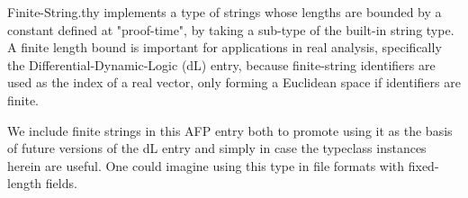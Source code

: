 %
\begin{isabellebody}%
%
%
\begin{isamarkuptext}%
Finite-String.thy implements a type of strings whose lengths are bounded by a constant defined 
    at "proof-time", by taking a sub-type of the built-in string type. A finite length bound is
    important for applications in real analysis, specifically the Differential-Dynamic-Logic (dL) 
    entry, because finite-string identifiers are used as the index of a real vector, only forming a
    Euclidean space if identifiers are finite.

    We include finite strings in this AFP entry both to promote using it as the basis of future
    versions of the dL entry and simply in case the typeclass instances herein are useful. One could
    imagine using this type in file formats with fixed-length fields.


\end{isamarkuptext}
\end{isabellebody}
